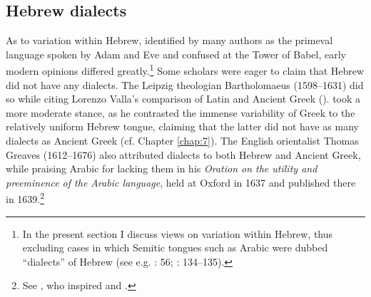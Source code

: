 \subsection{Hebrew dialects}

As to variation within Hebrew, identified by many authors as the primeval language spoken by Adam and Eve and confused at the Tower of Babel, early modern opinions differed greatly.\footnote{In the present section I discuss views on variation within Hebrew, thus excluding cases in which Semitic tongues such as Arabic were dubbed “dialects” of Hebrew (see e.g. \citealt{Bochart1646}: 56; \citealt{Martin1737}: 134–135).} Some scholars were eager to claim that Hebrew did not have any dialects. The Leipzig theologian Bartholomaeus (1598–1631) did so while citing Lorenzo Valla’s comparison of Latin and Ancient Greek (\citeyear[10]{Mayer1629}). \citet[\textsc{b.3}\textsc{\textsuperscript{v}}]{Junius1579} took a more moderate stance, as he contrasted the immense variability of Greek to the relatively uniform Hebrew tongue, claiming that the latter did not have as many dialects as Ancient Greek (cf. Chapter \ref{chap:7}). The English orientalist Thomas Greaves (1612–1676) also attributed dialects to both Hebrew and Ancient Greek, while praising Arabic for lacking them in his \textit{Oration on the utility and preeminence of the Arabic language}, held at Oxford in 1637 and published there in 1639.\footnote{See \citet[19--20]{Greaves1639}, who inspired \citet[60]{Leigh1656} and \citet[73]{Blount1680}.}

